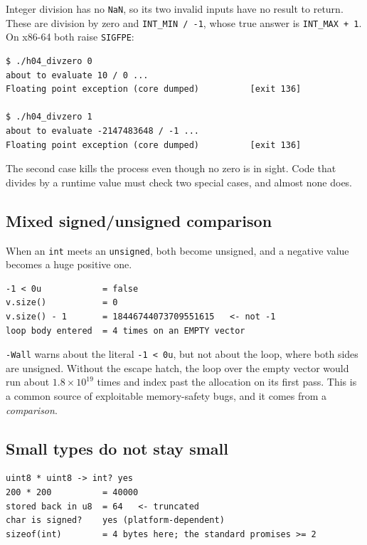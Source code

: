 \documentclass[11pt,a4paper]{article}
\newcommand{\code}[1]{\texttt{\small #1}}
\begin{document}
Integer division has no \code{NaN}, so its two invalid inputs have no result to
return. These are division by zero and \code{INT\_MIN / -1}, whose true answer
is \code{INT\_MAX + 1}. On x86-64 both raise \code{SIGFPE}:

\begin{lstlisting}[style=term]
$ ./h04_divzero 0
about to evaluate 10 / 0 ...
Floating point exception (core dumped)          [exit 136]

$ ./h04_divzero 1
about to evaluate -2147483648 / -1 ...
Floating point exception (core dumped)          [exit 136]
\end{lstlisting}

\noindent
The second case kills the process even though no zero is in sight. Code that
divides by a runtime value must check two special cases, and almost none does.

\subsection{Mixed signed/unsigned comparison}

When an \code{int} meets an \code{unsigned}, both become unsigned, and a
negative value becomes a huge positive one.


\begin{lstlisting}[style=term]
-1 < 0u            = false
v.size()           = 0
v.size() - 1       = 18446744073709551615   <- not -1
loop body entered  = 4 times on an EMPTY vector
\end{lstlisting}

\noindent
\code{-Wall} warns about the literal \code{-1 < 0u}, but not about the loop,
where both sides are unsigned. Without the escape hatch, the loop over the empty vector would run about
$1.8\times10^{19}$ times and index past the allocation on its first pass. This
is a common source of exploitable memory-safety bugs, and it comes from a
\emph{comparison}.

\subsection{Small types do not stay small}


\begin{lstlisting}[style=term]
uint8 * uint8 -> int? yes
200 * 200          = 40000
stored back in u8  = 64   <- truncated
char is signed?    yes (platform-dependent)
sizeof(int)        = 4 bytes here; the standard promises >= 2
\end{lstlisting}
\end{document}
